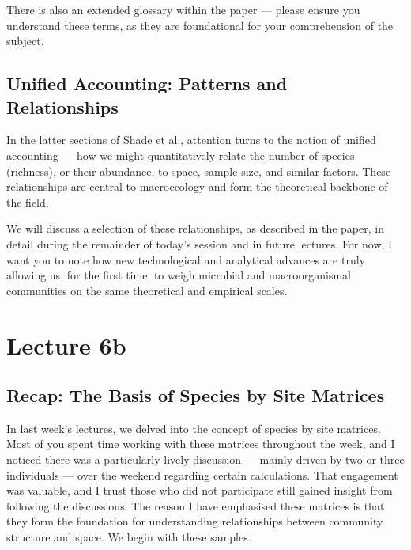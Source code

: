 \documentclass[
  12pt,
]{book}
\begin{document}
There is also an extended glossary within the paper --- please ensure
you understand these terms, as they are foundational for your
comprehension of the subject.

\section{Unified Accounting: Patterns and
Relationships}\label{unified-accounting-patterns-and-relationships}

In the latter sections of Shade et al., attention turns to the notion of
unified accounting --- how we might quantitatively relate the number of
species (richness), or their abundance, to space, sample size, and
similar factors. These relationships are central to macroecology and
form the theoretical backbone of the field.

We will discuss a selection of these relationships, as described in the
paper, in detail during the remainder of today's session and in future
lectures. For now, I want you to note how new technological and
analytical advances are truly allowing us, for the first time, to weigh
microbial and macroorganismal communities on the same theoretical and
empirical scales.

\chapter*{Lecture 6b}\label{lecture-6b}

\section{Recap: The Basis of Species by Site
Matrices}\label{recap-the-basis-of-species-by-site-matrices}

In last week's lectures, we delved into the concept of species by site
matrices. Most of you spent time working with these matrices throughout
the week, and I noticed there was a particularly lively discussion ---
mainly driven by two or three individuals --- over the weekend regarding
certain calculations. That engagement was valuable, and I trust those
who did not participate still gained insight from following the
discussions. The reason I have emphasised these matrices is that they
form the foundation for understanding relationships between community
structure and space. We begin with these samples.
\end{document}

